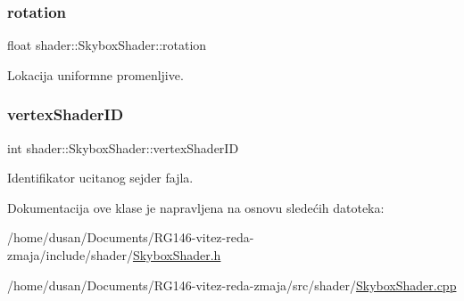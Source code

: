 \subsubsection{\texorpdfstring{rotation}{rotation}}
{\footnotesize\ttfamily float shader\+::\+Skybox\+Shader\+::rotation\hspace{0.3cm}{\ttfamily [private]}}



Lokacija uniformne promenljive. 

\mbox{\label{classshader_1_1SkyboxShader_ad0770dc09d144e47273dc691e3aec00c}} 
\subsubsection{\texorpdfstring{vertex\+Shader\+ID}{vertexShaderID}}
{\footnotesize\ttfamily int shader\+::\+Skybox\+Shader\+::vertex\+Shader\+ID\hspace{0.3cm}{\ttfamily [private]}}



Identifikator ucitanog sejder fajla. 



Dokumentacija ove klase je napravljena na osnovu sledećih datoteka\+:\begin{DoxyCompactItemize}
\item 
/home/dusan/\+Documents/\+R\+G146-\/vitez-\/reda-\/zmaja/include/shader/\hyperlink{SkyboxShader_8h}{Skybox\+Shader.\+h}\item 
/home/dusan/\+Documents/\+R\+G146-\/vitez-\/reda-\/zmaja/src/shader/\hyperlink{SkyboxShader_8cpp}{Skybox\+Shader.\+cpp}\end{DoxyCompactItemize}
